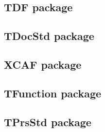 \documentclass[11pt]{article}
\begin{document}
\subsection{TDF package}
\label{sec:org2d7df14}


\subsection{TDocStd package}
\label{sec:org8847fa4}

\subsection{XCAF package}
\label{sec:org88bed77}

\subsection{TFunction package}
\label{sec:orgb10568f}

\subsection{TPrsStd package}
\label{sec:org32642c9}
\end{document}
